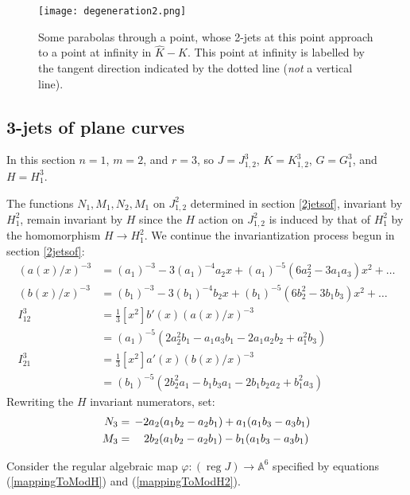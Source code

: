 \documentclass[12pt]{article}
\numberwithin{equation}{section}
\theoremstyle{plain}
\theoremstyle{definition}
\newcommand{\ra}{\rightarrow}
\newcommand{\A}{\mathbb{A}}
\begin{document}
\begin{figure}[H]
 \centering
   \texttt{[image: degeneration2.png]}
   \caption{Some parabolas through a point, whose 2-jets at this point approach to a point at infinity in $\widehat{K}-K$. This point at infinity is labelled by the tangent direction indicated by the dotted line (\emph{not} a vertical line).}
\end{figure}

\subsection{3-jets of plane curves}\label{3jetsof}

In this section $n=1$, $m=2$, and $r=3$, so $J=J^{3}_{1,2}$, $K=K^{3}_{1,2}$,  $G=G^{3}_{1}$, and $H=H^{3}_{1}$.

The functions $N_1,M_1,N_2,M_1$ on $J^{2}_{1,2}$ determined in section \ref{2jetsof}, invariant by $H^{2}_{1}$, remain invariant by $H$ since the $H$ action on $J^{2}_{1,2}$ is induced by that of $H^{2}_{1}$ by the homomorphism $H\ra H^{2}_{1}$. We continue the invariantization process begun in section \ref{2jetsof}:
\begin{align*}
(a(x)/x)^{-3}&= (a_1)^{-3} - 3(a_1)^{-4}a_2x + (a_1)^{-5}(6a_{2}^{2}-3a_{1}a_{3})x^2 + \dots\\
(b(x)/x)^{-3}&= (b_1)^{-3} - 3(b_1)^{-4}b_2x + (b_1)^{-5}(6b_{2}^{2}-3b_{1}b_{3})x^2 + \dots\\
I_{12}^{3}&=\tfrac{1}{3}[x^{2}]b'(x)(a(x)/x)^{-3}\\
          &=(a_1)^{-5}(2a_{2}^{2}b_{1}-a_{1}a_{3}b_{1}-2a_{1}a_{2}b_{2}+a_{1}^{2}b_{3})\\
I_{21}^{3}&=\tfrac{1}{3}[x^{2}]a'(x)(b(x)/x)^{-3}\\
          &=(b_1)^{-5}(2b_{2}^{2}a_{1}-b_{1}b_{3}a_{1}-2b_{1}b_{2}a_{2}+b_{1}^{2}a_{3})
\end{align*}
Rewriting the $H$ invariant numerators, set:
\begin{align}\label{mappingToModH2}
\begin{split}
N_3 &= \thinspace -2a_2(a_{1}b_{2}-a_2b_{1}) +  a_{1}(a_{1}b_{3}-a_{3}b_{1}) \\
M_3 &= \quad       2b_2(a_{1}b_{2}-a_2b_{1}) -  b_{1}(a_{1}b_{3}-a_{3}b_{1})
\end{split}
\end{align}

Consider the regular algebraic map $\varphi:(\operatorname{reg}J)\ra \A^{6}$ specified by equations (\ref{mappingToModH}) and (\ref{mappingToModH2}).
\end{document}
